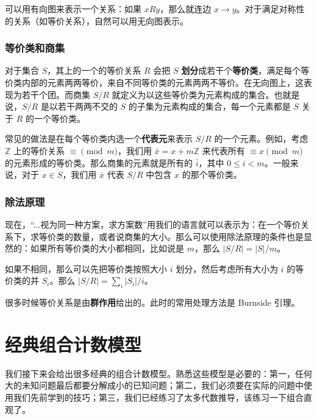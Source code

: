     可以用有向图来表示一个关系：如果 $xRy$，那么就连边 $x\to y$。对于满足对称性的关系（如等价关系），自然可以用无向图表示。
    \subsubsection{等价类和商集}
    对于集合 $S$，其上的一个的等价关系 $R$ 会把 $S$ \textbf{划分}成若干个\textbf{等价类}，满足每个等价类内部的元素两两等价，来自不同等价类的元素两两不等价。在无向图上，这表现为若干个团。而商集 $S/R$ 就定义为以这些等价类为元素构成的集合。也就是说，$S/R$ 是以若干两两不交的 $S$ 的子集为元素构成的集合，每一个元素都是 $S$ 关于 $R$ 的一个等价类。

    常见的做法是在每个等价类内选一个\textbf{代表元}来表示 $S/R$ 的一个元素。例如，考虑 $\mathbb Z$ 上的等价关系 $\equiv\pmod m$，我们用 $\bar x=x+m\mathbb{Z}$ 来代表所有 $\equiv x\pmod m$ 的元素形成的等价类。那么商集的元素就是所有的 $\bar i$，其中 $0\le i<m$。一般来说，对于 $x\in S$，我们用 $\bar x$ 代表 $S/R$ 中包含 $x$ 的那个等价类。

    \subsubsection{除法原理}
    现在，“...视为同一种方案，求方案数”用我们的语言就可以表示为：在一个等价关系下，求等价类的数量，或者说商集的大小。那么可以使用除法原理的条件也是显然的：如果所有等价类的大小都相同，比如说是 $m$，那么 $|S/R|=|S|/m$。

    如果不相同，那么可以先把等价类按照大小 $i$ 划分，然后考虑所有大小为 $i$ 的等价类的并 $S_i$。那么 $|S/R|=\sum_i |S_i|/i$。

    很多时候等价关系是由\textbf{群作用}给出的。此时的常用处理方法是 Burnside 引理。


\section{经典组合计数模型}
    我们接下来会给出很多经典的组合计数模型。熟悉这些模型是必要的：第一，任何大的未知问题最后都要分解成小的已知问题；第二，我们必须要在实际的问题中使用我们先前学到的技巧；第三，我们已经练习了太多代数推导，该练习一下组合直观了。
